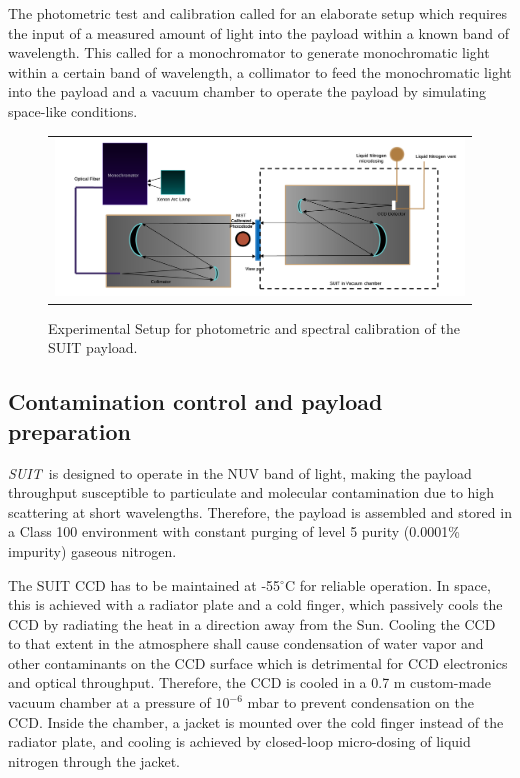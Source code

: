 \documentclass[12pt]{spieman}  %
\newcommand{\suit}{{\it SUIT~}}
\newcommand{\degree}{$^{\circ}$}
\begin{document}
The photometric test and calibration called for an elaborate setup which requires the input of a measured amount of light into the payload within a known band of wavelength. This called for a monochromator to generate monochromatic light within a certain band of wavelength, a collimator to feed the monochromatic light into the payload and a vacuum chamber to operate the payload by simulating space-like conditions.

\begin{figure}[ht]
\begin{center}
\begin{tabular}{c}
\includegraphics[trim={2.5cm 0 1.5cm 1.5cm},clip,width=0.8\linewidth]{experimental_setup}
\end{tabular}
\end{center}
\caption 
{ \label{fig:experimentalsetup} Experimental Setup for photometric and spectral calibration of the SUIT payload.} 
\end{figure}

\subsection{Contamination control and payload preparation}

\suit is designed to operate in the NUV band of light, making the payload throughput susceptible to particulate and molecular contamination due to high scattering at short wavelengths. Therefore, the payload is assembled and stored in a Class 100 environment with constant purging of level 5 purity (0.0001\% impurity) gaseous nitrogen.
 
 The SUIT CCD has to be maintained at -55\degree C for reliable operation. In space, this is achieved with a radiator plate and a cold finger, which passively cools the CCD by radiating the heat in a direction away from the Sun. Cooling the CCD to that extent in the atmosphere shall cause condensation of water vapor and other contaminants on the CCD surface which is detrimental for CCD electronics and optical throughput. Therefore, the CCD is cooled in a 0.7 m custom-made vacuum chamber at a pressure of $10^{-6}$ mbar to prevent condensation on the CCD.
 Inside the chamber, a jacket is mounted over the cold finger instead of the radiator plate, and cooling is achieved by closed-loop micro-dosing of liquid nitrogen through the jacket.
\end{document}
